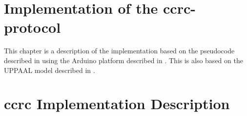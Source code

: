 \section{Implementation of the \gls{ccrc}-protocol}
This chapter is a description of the implementation based on the pseudocode described in  using the Arduino platform described in . 
This is also based on the UPPAAL model described in .
\section{\gls{ccrc} Implementation Description}


